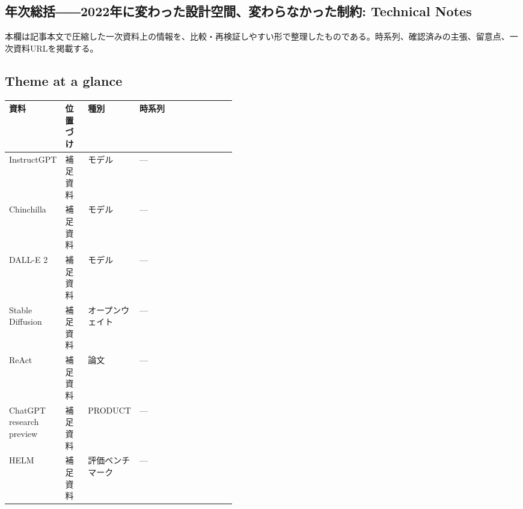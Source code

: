\subsection*{年次総括――2022年に変わった設計空間、変わらなかった制約: Technical Notes}
本欄は記事本文で圧縮した一次資料上の情報を、比較・再検証しやすい形で整理したものである。時系列、確認済みの主張、留意点、一次資料URLを掲載する。
\medskip
\subsection*{Theme at a glance}
\begin{center}
\footnotesize
\begin{tabularx}{\linewidth}{@{}p{0.20\linewidth}p{0.10\linewidth}p{0.14\linewidth}X@{}}
\toprule
資料 & 位置づけ & 種別 & 時系列 \\
\midrule
InstructGPT & 補足資料 & モデル & — \\
Chinchilla & 補足資料 & モデル & — \\
DALL-E 2 & 補足資料 & モデル & — \\
Stable Diffusion & 補足資料 & オープンウェイト & — \\
ReAct & 補足資料 & 論文 & — \\
ChatGPT research preview & 補足資料 & PRODUCT & — \\
HELM & 補足資料 & 評価ベンチマーク & — \\
\bottomrule
\end{tabularx}
\end{center}
\normalsize


